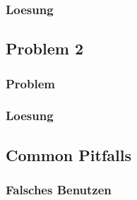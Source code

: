 \documentclass{beamer}
\begin{document}

			\begin{frame}
				\frametitle{Loesung}
			\end{frame}


		\subsection{Problem 2}

			\begin{frame}
				\frametitle{Problem}
			\end{frame}

			\begin{frame}
				\frametitle{Loesung}
			\end{frame}

		\subsection{Common Pitfalls}

			\begin{frame}
				\frametitle{Falsches Benutzen}
			\end{frame}
\end{document}
